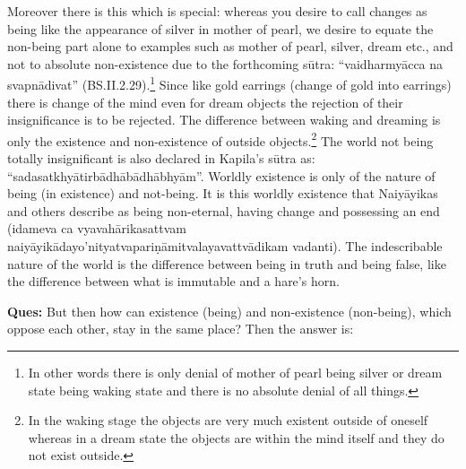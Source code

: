 Moreover there is this which is special: whereas you desire to call changes as being like the appearance of silver in mother of pearl, we desire to equate the non-being part alone to examples such as mother of pearl, silver, dream etc., and not to absolute non-existence due to the forthcoming sūtra: “vaidharmyācca na svapnādivat” (BS.II.2.29).\footnote{In other words there is only denial of mother of pearl being silver or dream state being waking state and there is no absolute denial of all things.} Since like gold earrings (change of gold into earrings) there is change of the mind even for dream objects the rejection of their insignificance is to be rejected. The difference between waking and dreaming is only the existence and non-existence of outside objects.\footnote{In the waking stage the objects are very much existent outside of oneself whereas in a dream state the objects are within the mind itself and they do not exist outside.} The world not being totally insignificant is also declared in Kapila’s sūtra as: “sadasatkhyātirbādhābādhābhyām”.     Worldly existence is only of the nature of being (in existence) and not-being. It is this worldly existence that Naiyāyikas and others describe as being non-eternal, having change and possessing an end (idameva ca vyavahārikasattvam naiyāyikādayo’nityatvapariṇāmitvalayavattvādikam vadanti). The indescribable nature of the world is the difference between being in truth and being false, like the difference between what is immutable and a hare’s horn.

\textbf{Ques:} But then how can existence (being) and non-existence (non-being), which oppose each other, stay in the same place? Then the answer is: 

